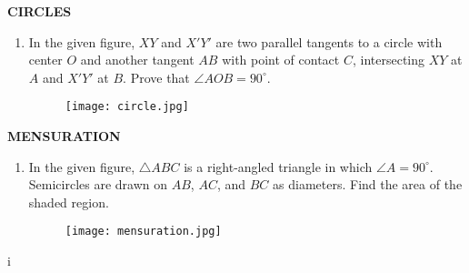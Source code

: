 \documentclass{article}
\begin{document}
\begin{center}
\textbf{CIRCLES}
\end{center}

\begin{enumerate}
    \item In the given figure, $XY$ and $X'Y'$ are two parallel tangents to a circle with center $O$ and another tangent $AB$ with point of contact $C$, intersecting $XY$ at $A$ and $X'Y'$ at $B$. Prove that $\angle AOB = 90^\circ$.\\
    \begin{figure}[h!]
        \centering
        \texttt{[image: circle.jpg]}
    \end{figure}
\end{enumerate}

\begin{center}
\textbf{MENSURATION}
\end{center}

\begin{enumerate}
    \item In the given figure, $\triangle ABC$ is a right-angled triangle in which $\angle A = 90^\circ$. Semicircles are drawn on $AB$, $AC$, and $BC$ as diameters. Find the area of the shaded region.
    \begin{figure}[h!]
        \centering
        \texttt{[image: mensuration.jpg]}
    \end{figure}
\end{enumerate}
i
\end{document}
